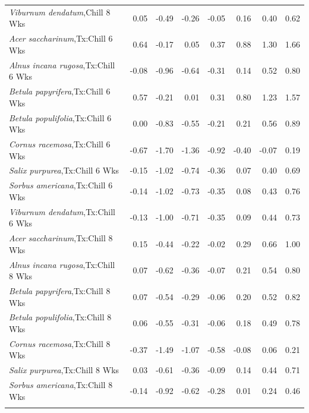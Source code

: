 \documentclass{article}\usepackage[]{graphicx}\usepackage[]{color}
\begin{document}
\begin{longtable}{lrrrrrrr}
  \textit{Viburnum dendatum},Chill 8 Wks & 0.05 & -0.49 & -0.26 & -0.05 & 0.16 & 0.40 & 0.62 \\ 
  \textit{Acer saccharinum},Tx:Chill 6 Wks & 0.64 & -0.17 & 0.05 & 0.37 & 0.88 & 1.30 & 1.66 \\ 
  \textit{Alnus incana rugosa},Tx:Chill 6 Wks & -0.08 & -0.96 & -0.64 & -0.31 & 0.14 & 0.52 & 0.80 \\ 
  \textit{Betula papyrifera},Tx:Chill 6 Wks & 0.57 & -0.21 & 0.01 & 0.31 & 0.80 & 1.23 & 1.57 \\ 
  \textit{Betula populifolia},Tx:Chill 6 Wks & 0.00 & -0.83 & -0.55 & -0.21 & 0.21 & 0.56 & 0.89 \\ 
  \textit{Cornus racemosa},Tx:Chill 6 Wks & -0.67 & -1.70 & -1.36 & -0.92 & -0.40 & -0.07 & 0.19 \\ 
  \textit{Salix purpurea},Tx:Chill 6 Wks & -0.15 & -1.02 & -0.74 & -0.36 & 0.07 & 0.40 & 0.69 \\ 
  \textit{Sorbus americana},Tx:Chill 6 Wks & -0.14 & -1.02 & -0.73 & -0.35 & 0.08 & 0.43 & 0.76 \\ 
  \textit{Viburnum dendatum},Tx:Chill 6 Wks & -0.13 & -1.00 & -0.71 & -0.35 & 0.09 & 0.44 & 0.73 \\ 
  \textit{Acer saccharinum},Tx:Chill 8 Wks & 0.15 & -0.44 & -0.22 & -0.02 & 0.29 & 0.66 & 1.00 \\ 
  \textit{Alnus incana rugosa},Tx:Chill 8 Wks & 0.07 & -0.62 & -0.36 & -0.07 & 0.21 & 0.54 & 0.80 \\ 
  \textit{Betula papyrifera},Tx:Chill 8 Wks & 0.07 & -0.54 & -0.29 & -0.06 & 0.20 & 0.52 & 0.82 \\ 
  \textit{Betula populifolia},Tx:Chill 8 Wks & 0.06 & -0.55 & -0.31 & -0.06 & 0.18 & 0.49 & 0.78 \\ 
  \textit{Cornus racemosa},Tx:Chill 8 Wks & -0.37 & -1.49 & -1.07 & -0.58 & -0.08 & 0.06 & 0.21 \\ 
  \textit{Salix purpurea},Tx:Chill 8 Wks & 0.03 & -0.61 & -0.36 & -0.09 & 0.14 & 0.44 & 0.71 \\ 
  \textit{Sorbus americana},Tx:Chill 8 Wks & -0.14 & -0.92 & -0.62 & -0.28 & 0.01 & 0.24 & 0.46 \\ 
   \hline
\hline
\label{tab:suppmodrtos}
\end{longtable}
\end{document}
